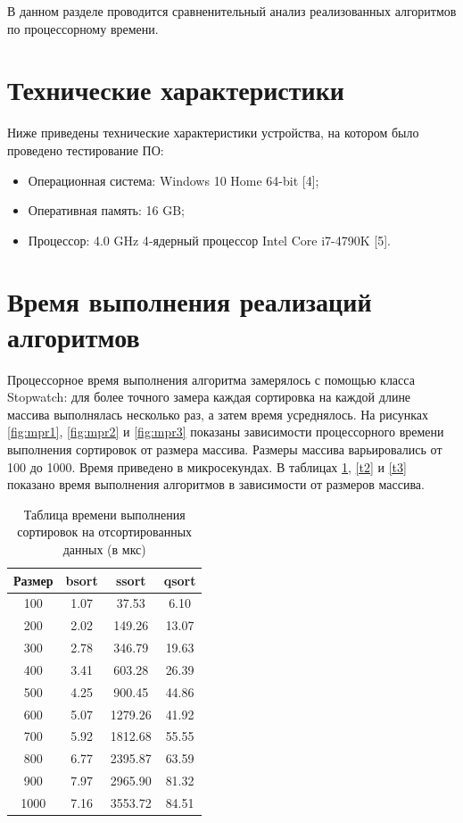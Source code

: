 \documentclass[12pt]{report}
\begin{document}
В данном разделе проводится сравненительный анализ реализованных алгоритмов по процессорному времени.

\section{Технические характеристики}

Ниже приведены технические характеристики устройства, на котором было проведено тестирование ПО:

\begin{itemize}
	\item Операционная система: Windows 10 Home 64-bit [4];
	\item Оперативная память: 16 GB;
	\item Процессор: 4.0 GHz 4‑ядерный процессор Intel Core i7-4790K [5].

\end{itemize}

\section{Время выполнения реализаций алгоритмов}

Процессорное время выполнения алгоритма замерялось с помощью класса Stopwatch: для более точного замера каждая сортировка на каждой длине массива выполнялась несколько раз, а затем время усреднялось. 
На рисунках \ref{fig:mpr1}, \ref{fig:mpr2} и \ref{fig:mpr3} показаны зависимости процессорного времени выполнения сортировок от размера массива. Размеры массива варьировались от 100 до 1000. Время приведено в микросекундах. В таблицах \ref{t1}, \ref{t2} и \ref{t3} показано время выполнения алгоритмов в зависимости от размеров массива.

\begin{table} [H]
	\caption{Таблица времени выполнения сортировок на отсортированных данных (в мкс)}
	\label{t1}
	\begin{center}
	\begin{tabular}{|c c c c|}
	\hline
	Размер & bsort & ssort & qsort  \\ [0.5ex]
	\hline
	100 & 1.07 & 37.53 & 6.10  \\ 
	\hline
	200 & 2.02 & 149.26 & 13.07  \\ 
	\hline
	300 & 2.78 & 346.79 & 19.63  \\ 
	\hline
	400 & 3.41 & 603.28 & 26.39  \\ 
	\hline
	500 & 4.25 & 900.45 & 44.86  \\ 
	\hline
	600 & 5.07 & 1279.26 & 41.92  \\ 
	\hline
	700 & 5.92 & 1812.68 & 55.55 \\ 
	\hline
	800 & 6.77 & 2395.87 & 63.59  \\ 
	\hline
	900 & 7.97 & 2965.90 & 81.32 \\
	\hline
	1000 & 7.16 & 3553.72 & 84.51 \\
	\hline 
	\end{tabular}
	\end{center}
\end{table}
\end{document}
